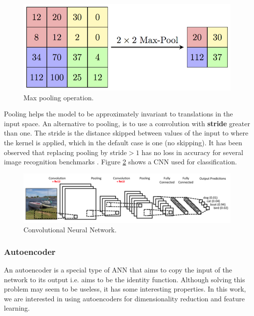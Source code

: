 \begin{figure}[H]
    \centering
    \includegraphics[width=0.4\linewidth]{imagenes/cap1/max_pool.png}
    \caption{Max pooling operation.\protect\footnotemark}
    \label{fig:maxpool}
\end{figure}

Pooling helps the model to be approximately invariant to translations in the input space. An alternative to pooling, is to use a convolution with \textbf{stride} greater than one. The stride is the distance skipped between values of the input to where the kernel is applied, which in the default case is one (no skipping). It has been observed that replacing pooling by stride$>1$ has no loss in accuracy for several image recognition benchmarks \cite{springenberg2014striving}. Figure \ref{fig:cnn} shows a CNN used for classification.
    
\begin{figure}[H]
\centering
\includegraphics[width=0.9\linewidth]{imagenes/cap1/cnn.png}
\caption{Convolutional Neural Network.\protect\footnotemark}
\label{fig:cnn}
\end{figure}

\subsubsection{Autoencoder}
    
An autoencoder is a special type of ANN that aims to copy the input of the network to its output i.e. aims to be the identity function. Although solving this problem may seem to be useless, it has some interesting properties. In this work, we are interested in using autoencoders for dimensionality reduction and feature learning. 

